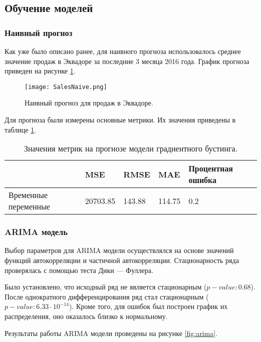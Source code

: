 \documentclass[]{article}
\begin{document}
\subsection{Обучение моделей}

\subsubsection{Наивный прогноз}

Как уже было описано ранее, для наивного прогноза использовалось среднее значение продаж в Эквадоре за последние 3 месяца 2016 года. График прогноза приведен на рисунке \ref{naive}.

\begin{figure}[h!]
	\centering
	\texttt{[image: SalesNaive.png]}
	\caption{Наивный прогноз для продаж в Эквадоре.}
	\label{naive}
\end{figure}

Для прогноза были измерены основные метрики. Их значения приведены в таблице \ref{tab:1}.

\begin{table}[h!]
	\centering
	\caption{Значения метрик на прогнозе модели градиентного бустинга.}
	\begin{tabularx}{\textwidth}{|X|l|l|l|l|}
		\hline
								& MSE       & RMSE   & MAE    & Процентная ошибка \\ \hline
		{Временные переменные}  & 20703.85  & 143.88 & 114.75 & 0.2               \\ \hline
	\end{tabularx}
	\label{tab:1}
\end{table}



\subsubsection{ARIMA модель}

Выбор параметров для ARIMA модели осуществлялся на основе значений функций автокорреляции и частичной автокорреляции. Стационарность ряда проверялась с помощью теста  Дики — Фуллера.

Было установлено, что исходный ряд не является стационарным ($p-value: 0.68$). После однократного дифференцирования ряд стал стационарным ($p-value: 6.33 \cdot 10^{-14}$). Кроме того, для ошибок был построен график их распределения, оно оказалось близко к нормальному. 

Результаты работы ARIMA модели проведены на рисунке \ref{fig:arima}.
\end{document}
